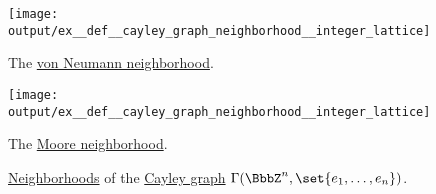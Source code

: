 \begin{example}
\begin{thmenum}
    \begin{figure}[!ht]
      \begin{subcaptionblock}{0.45\textwidth}
        \centering
        \texttt{[image: output/ex\_\_def\_\_cayley\_graph\_neighborhood\_\_integer\_lattice]}
        \caption{The \hyperref[def:cayley_graph_neighborhood/von_neumann]{von Neumann neighborhood}.}\label{fig:ex:def:cayley_graph_neighborhood/integer_lattice/von_neumann}
      \end{subcaptionblock}
      \hfill
      \begin{subcaptionblock}{0.45\textwidth}
        \centering
        \texttt{[image: output/ex\_\_def\_\_cayley\_graph\_neighborhood\_\_integer\_lattice]}
        \caption{The \hyperref[def:cayley_graph_neighborhood/moore]{Moore neighborhood}.}\label{fig:ex:def:cayley_graph_neighborhood/integer_lattice/moore}
      \end{subcaptionblock}
      \caption{\hyperref[def:cayley_graph_neighborhood]{Neighborhoods} of the \hyperref[def:cayley_graph]{Cayley graph} \( \Gamma(\BbbZ^n, \set{ e_1, \ldots, e_n }) \).}\label{fig:ex:def:cayley_graph_neighborhood/integer_lattice}
    \end{figure}
  \end{thmenum}
\end{example}
